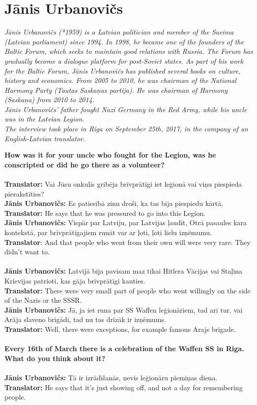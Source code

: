 \section{Jānis Urbanovičs}

\textit{Jānis Urbanovičs (*1959) is a Latvian politician and member of the Saeima (Latvian parliament) since 1994. In 1998, he became one of the founders of the Baltic Forum, which seeks to maintain good relations with Russia. The Forum has gradually become a dialogue platform for post-Soviet states. As part of his work for the Baltic Forum, Jānis Urbanovičs has published several books on culture, history and economics. From 2005 to 2010, he was chairman of the National Harmony Party (Tautas Saskaņas partija). He was chairman of Harmony (Saskaņa) from 2010 to 2014.\\
Jānis Urbanovičs’ father fought Nazi Germany in the Red Army, while his uncle was in the Latvian Legion.\\
The interview took place in Riga on September 25th, 2017, in the company of an English-Latvian translator.}\par
\vspace*{2em}
\textbf{How was it for your uncle who fought for the Legion, was he conscripted or did he go there as a volunteer?}\\
\\
\textbf{Translator:} Vai Jūsu onkulis gribēja brīvprātīgi iet leģionā vai viņu piespieda pierakstīties?\\
\textbf{Jānis Urbanovičs:} Es patiesībā zinu droši, ka tas bija piespiedu kārtā.\\
\textbf{Translator:} He says that he was pressured to go into this Legion.\\
\textbf{Jānis Urbanovičs:} Vispār par Latviju, par Latvijas ļaudīt, Otrā pasaules kara kontekstā, par brīvprātīgajiem runāt var ar ļoti, ļoti lielu izņēmumu.\\
\textbf{Translator}: And that people who went from their own will were very rare. They didn’t want to.\\
\\
\textbf{Jānis Urbanovičs:} Latvijā bija pavisam maz tikai Hitlera Vācijas vai Staļina Krievijas patrioti, kas gāja brīvprātīgi kauties. \\
\textbf{Translator:} There were very small part of people who went willingly on the side of the Nazis or the SSSR.\\ 
\textbf{Jānis Urbanovičs:} Jā, ja iet runa par SS Waffen leģionāriem, tad arī tur, vai Arāja slaveno brigādi, tad nu tas drīzāk ir izņēmums.\\
\textbf{Translator:} Well, there were exceptions, for example famous Arajs brigade.\\
\\
\textbf{Every 16th of March there is a celebration of the Waffen SS in Riga. What do you think about it?} \\
\\
\textbf{Jānis Urbanovičs:} Tā ir izrādīšanās, nevis leģionāru piemiņas diena.\\
\textbf{Translator:} He says that it’s just showing off, and not a day for remembering people.

